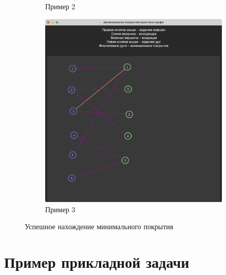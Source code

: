 \documentclass[12pt]{article}
\begin{document}
\begin{figure}[h]
\begin{subfigure}{0.3\textwidth}
        \caption{Пример 2}
        \label{fig:screenshot3}
    \end{subfigure}
    \begin{subfigure}{0.3\textwidth}
        \includegraphics[width=1\textwidth]{screenshot4.png}
        \caption{Пример 3}
        \label{fig:screenshot4}
    \end{subfigure}
    \caption{Успешное нахождение минимального покрытия}
    \label{fig:success_example}
\end{figure}


\section{Пример прикладной задачи}
\end{document}
